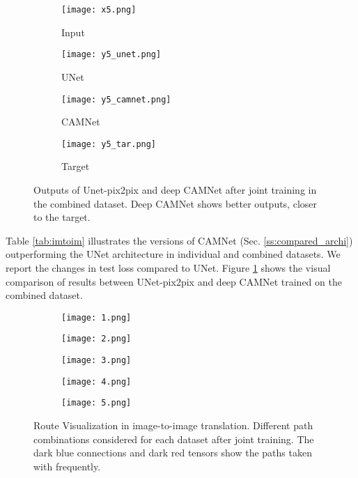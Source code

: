 \documentclass[10pt,twocolumn,letterpaper]{article}
\begin{document}
\begin{figure}[htbp]
\begin{center}
		\begin{subfigure}[b]{0.24\linewidth}
			\texttt{[image: x5.png]}
			\caption{Input} 
		\end{subfigure}
		\begin{subfigure}[b]{0.24\linewidth}
			\texttt{[image: y5\_unet.png]}
			\caption{UNet}
		\end{subfigure}
		\begin{subfigure}[b]{0.24\linewidth}
			\texttt{[image: y5\_camnet.png]}
			\caption{CAMNet}
		\end{subfigure}
		\begin{subfigure}[b]{0.24\linewidth}
			\texttt{[image: y5\_tar.png]}
			\caption{Target}
		\end{subfigure}
		
	\end{center}
	\vspace{-0.2in}
	\caption{Outputs of Unet-pix2pix and deep CAMNet after joint training in the combined dataset. Deep CAMNet shows better outputs, closer to the target.}
	\label{fig:imtoim}
	\vspace{-0.1in}
\end{figure}


Table \ref{tab:imtoim} illustrates the versions of CAMNet (Sec. \ref{ss:compared_archi}) outperforming the UNet architecture in individual and combined datasets. We report the changes in test loss compared to UNet. Figure \ref{fig:imtoim} shows the visual comparison of results between UNet-pix2pix and deep CAMNet trained on the combined dataset.

\begin{figure}[ht]
	\begin{center}
		\begin{subfigure}[b]{\columnwidth}
			\texttt{[image: 1.png]}
		\end{subfigure}
		\begin{subfigure}[b]{\columnwidth}
			\texttt{[image: 2.png]}
		\end{subfigure}
		\begin{subfigure}[b]{\columnwidth}
			\texttt{[image: 3.png]}
		\end{subfigure}
		\begin{subfigure}[b]{\columnwidth}
			\texttt{[image: 4.png]}
		\end{subfigure}
		\begin{subfigure}[b]{\columnwidth}
			\texttt{[image: 5.png]}
		\end{subfigure}
	\end{center}
	\vspace{-0.2in}
	\caption{Route Visualization in image-to-image translation. Different path combinations considered for each dataset after joint training. The dark blue connections and dark red tensors show the paths taken with frequently.}
	\label{fig:imtoim_routes}
	\vspace{-0.1in}
\end{figure}
\end{document}
